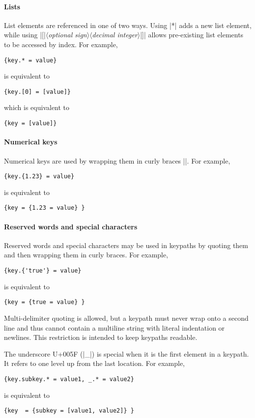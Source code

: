 \documentclass[11pt]{article}
\newcommand{\vmeta}[1]{{\color{DarkRed}\ensuremath{\langle}\textit{#1}\ensuremath{\rangle}}}
\begin{document}
{{\paragraph{Lists}

List elements are referenced in one of two ways.  Using |*| adds a new list element, while using |[|\vmeta{optional sign}\vmeta{decimal integer}|]| allows pre-existing list elements to be accessed by index.  For example,
\begin{Verbatim}
{key.* = value}
\end{Verbatim}
is equivalent to
\begin{Verbatim}
{key.[0] = [value]}
\end{Verbatim}
which is equivalent to
\begin{Verbatim}
{key = [value]}
\end{Verbatim}


\paragraph{Numerical keys}

Numerical keys are used by wrapping them in curly braces |{}|.  For example,
\begin{Verbatim}
{key.{1.23} = value}
\end{Verbatim}
is equivalent to 
\begin{Verbatim}
{key = {1.23 = value} }
\end{Verbatim}

\paragraph{Reserved words and special characters}

Reserved words and special characters may be used in keypaths by quoting them and then wrapping them in curly braces.  For example,
\begin{Verbatim}
{key.{'true'} = value}
\end{Verbatim}
is equivalent to 
\begin{Verbatim}
{key = {true = value} }
\end{Verbatim}
Multi-delimiter quoting is allowed, but a keypath must never wrap onto a second line and thus cannot contain a multiline string with literal indentation or newlines.  This restriction is intended to keep keypaths readable.

The underscore U+005F (|_|) is special when it is the first element in a keypath.  It refers to one level up from the last location.  For example,
\begin{Verbatim}
{key.subkey.* = value1, _.* = value2}
\end{Verbatim}
is equivalent to
\begin{Verbatim}
{key  = {subkey = [value1, value2]} }
\end{Verbatim}

}}
\end{document}
